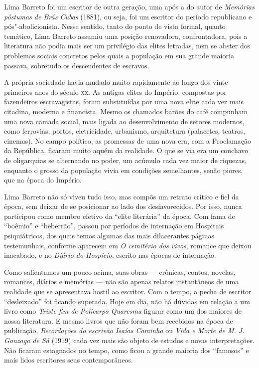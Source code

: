 \documentclass{extarticle}
\begin{document}
Lima Barreto foi um escritor de outra geração, uma após a do autor de
\emph{Memórias póstumas de Brás Cubas} (1881), ou seja, foi um escritor
do período republicano e pós"-abolicionista. Nesse sentido, tanto do
ponto de vista formal, quanto temático, Lima Barreto assumiu uma posição
renovadora, confrontadora, pois a literatura não podia mais ser um
privilégio das elites letradas, nem se abster dos problemas sociais
concretos pelos quais a população em sua grande maioria passava,
sobretudo os descendentes de escravos.

A própria sociedade havia mudado muito rapidamente ao longo dos vinte
primeiros anos do século \textsc{xx}. As antigas elites do Império, compostas por
fazendeiros escravagistas, foram substituídas por uma nova elite cada
vez mais citadina, moderna e financista. Mesmo os chamados barões do
café compunham uma nova camada social, mais ligada ao desenvolvimento de
setores modernos, como ferrovias, portos, eletricidade, urbanismo,
arquitetura (palacetes, teatros, cinemas). No campo político, as
promessas de uma nova era, com a Proclamação da República, ficaram muito
aquém da realidade. O que se via era um conchavo de oligarquias se
alternando no poder, um acúmulo cada vez maior de riquezas, enquanto o
grosso da população vivia em condições semelhantes, senão piores, que na
época do Império.

Lima Barreto não só viveu tudo isso, mas compôs um retrato crítico e
fiel da época, sem deixar de se posicionar ao lado dos desfavorecidos.
Por isso, nunca participou como membro efetivo da ``elite literária'' da
época. Com fama de ``boêmio'' e ``beberrão'', passou por períodos de
internação em Hospitais psiquiátricos, dos quais temos algumas das mais
dilacerantes páginas testemunhais, conforme aparecem em \emph{O
cemitério dos vivos}, romance que deixou inacabado, e no \emph{Diário do
Hospício}, escrito nas épocas de internação.

Como salientamos um pouco acima, suas obras --- crônicas, contos,
novelas, romances, diários e memórias --- não são apenas relatos
instantâneos de uma realidade que se apresentava hostil ao escritor. Com
o tempo, a pecha de escritor ``desleixado'' foi ficando superada. Hoje
em dia, não há dúvidas em relação a um livro como \emph{Triste fim de
Policarpo Quaresma} figurar como um dos maiores de nossa literatura. E
mesmo livros que não foram bem recebidos na época de publicação,
\emph{Recordações do escrivão Isaías Caminha} ou \emph{Vida e Morte de
M. J. Gonzaga de Sá} (1919) cada vez mais são objeto de estudos e novas
interpretações. Não ficaram estagnados no tempo, como ficou a grande
maioria dos ``famosos'' e mais lidos escritores seus contemporâneos.
\end{document}
